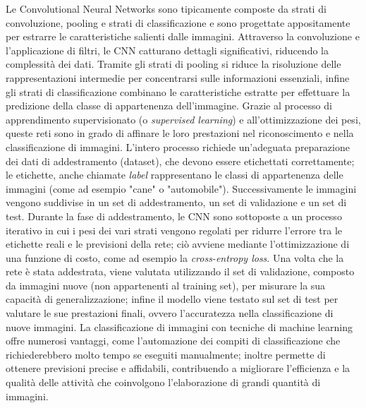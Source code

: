 Le Convolutional Neural Networks sono tipicamente composte da strati di convoluzione, pooling e strati di classificazione e sono progettate appositamente per estrarre le caratteristiche salienti dalle immagini. Attraverso la convoluzione e l'applicazione di filtri, le CNN catturano dettagli significativi, riducendo la complessità dei dati. Tramite gli strati di pooling si riduce la risoluzione delle rappresentazioni intermedie  per concentrarsi sulle informazioni essenziali, infine gli strati di classificazione combinano le caratteristiche estratte per effettuare la predizione della classe di appartenenza dell'immagine.
Grazie al processo di apprendimento supervisionato (o \textit{supervised learning}) e all'ottimizzazione dei pesi, queste reti sono in grado di affinare le loro prestazioni nel riconoscimento e nella classificazione di immagini.
L'intero processo richiede un'adeguata preparazione dei dati di addestramento (dataset), che devono essere etichettati correttamente; le etichette, anche chiamate \textit{label} rappresentano le classi di appartenenza delle immagini (come ad esempio "cane" o "automobile"). Successivamente le immagini vengono suddivise in un set di addestramento, un set di validazione e un set di test. Durante la fase di addestramento, le CNN sono sottoposte a un processo iterativo in cui i pesi dei vari strati vengono regolati per ridurre l'errore tra le etichette reali e le previsioni della rete; ciò avviene mediante l'ottimizzazione di una funzione di costo, come ad esempio la \textit{cross-entropy loss}.
%
Una volta che la rete è stata addestrata, viene valutata utilizzando il set di validazione, composto da immagini nuove (non appartenenti al training set), per misurare la sua capacità di generalizzazione; infine il modello viene testato sul set di test per valutare le sue prestazioni finali, ovvero l'accuratezza nella classificazione di nuove immagini.
%
La classificazione di immagini con tecniche di machine learning offre numerosi vantaggi, come l'automazione dei compiti di classificazione che richiederebbero molto tempo se eseguiti manualmente; inoltre permette di ottenere previsioni precise e affidabili, contribuendo a migliorare l'efficienza e la qualità delle attività che coinvolgono l'elaborazione di grandi quantità di immagini.

